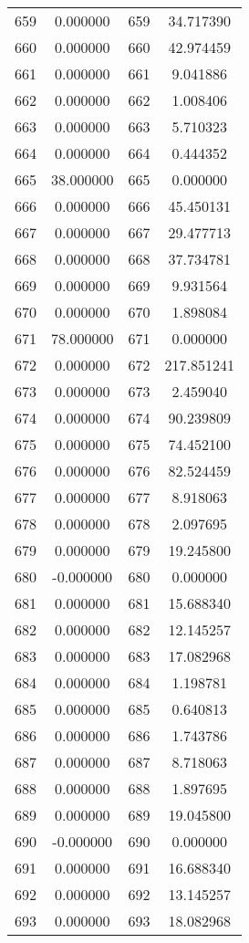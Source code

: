 \documentclass[12pt]{article}
\begin{document}
\begin{longtable}{@{}cccc@{}}
659 & 0.000000 & 659 & 34.717390 \\
660 & 0.000000 & 660 & 42.974459 \\
661 & 0.000000 & 661 & 9.041886 \\
662 & 0.000000 & 662 & 1.008406 \\
663 & 0.000000 & 663 & 5.710323 \\
664 & 0.000000 & 664 & 0.444352 \\
665 & 38.000000 & 665 & 0.000000 \\
666 & 0.000000 & 666 & 45.450131 \\
667 & 0.000000 & 667 & 29.477713 \\
668 & 0.000000 & 668 & 37.734781 \\
669 & 0.000000 & 669 & 9.931564 \\
670 & 0.000000 & 670 & 1.898084 \\
671 & 78.000000 & 671 & 0.000000 \\
672 & 0.000000 & 672 & 217.851241 \\
673 & 0.000000 & 673 & 2.459040 \\
674 & 0.000000 & 674 & 90.239809 \\
675 & 0.000000 & 675 & 74.452100 \\
676 & 0.000000 & 676 & 82.524459 \\
677 & 0.000000 & 677 & 8.918063 \\
678 & 0.000000 & 678 & 2.097695 \\
679 & 0.000000 & 679 & 19.245800 \\
680 & -0.000000 & 680 & 0.000000 \\
681 & 0.000000 & 681 & 15.688340 \\
682 & 0.000000 & 682 & 12.145257 \\
683 & 0.000000 & 683 & 17.082968 \\
684 & 0.000000 & 684 & 1.198781 \\
685 & 0.000000 & 685 & 0.640813 \\
686 & 0.000000 & 686 & 1.743786 \\
687 & 0.000000 & 687 & 8.718063 \\
688 & 0.000000 & 688 & 1.897695 \\
689 & 0.000000 & 689 & 19.045800 \\
690 & -0.000000 & 690 & 0.000000 \\
691 & 0.000000 & 691 & 16.688340 \\
692 & 0.000000 & 692 & 13.145257 \\
693 & 0.000000 & 693 & 18.082968 \\

\end{longtable}
\end{document}
